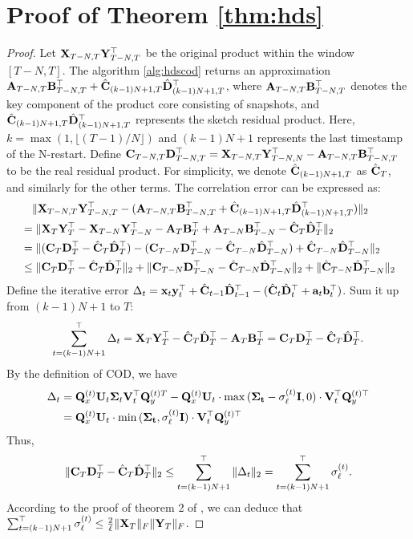 \section{Proof of Theorem \ref{thm:hds}}\label{apdx:hds}
\begin{proof}
    
Let ${\bf X}_{T-N,T}{\bf Y}_{T-N,T}^\top$ be the original product within the window $[T-N,T]$. The algorithm \ref{alg:hdscod} returns an approximation ${\bf A}_{T-N,T}{\bf B}_{T-N,T}^\top+\hat{{\bf C}}_{(k-1)N+1,T}\hat{{\bf D}}_{(k-1)N+1,T}^\top$, where ${\bf A}_{T-N,T}{\bf B}_{T-N,T}^\top$ denotes the key component of the product core consisting of snapshots, and $\hat{{\bf C}}_{(k-1)N+1,T}\hat{{\bf D}}_{(k-1)N+1,T}^\top$ represents the sketch residual product.  Here, $k=\operatorname*{max}(1,\lfloor(T-1)/N\rfloor)$ and $(k-1)N+1$ represents the last timestamp of the N-restart. Define ${\bf C}_{T-N,T}{\bf D}_{T-N,T}^\top = {\bf X}_{T-N,T}{\bf Y}_{T-N,N}^\top-{\bf A}_{T-N,T}{\bf B}_{T-N,T}^\top$ to be the real residual product. For simplicity, we denote $\hat{{\bf C}}_{(k-1)N+1,T}$ as $\hat{{\bf C}}_T$, and similarly for the other terms. The correlation error can be expressed as:
\begin{align}
    &\quad \|    {\bf X}_{T-N,T}{\bf Y}_{T-N,T}^\top-({\bf A}_{T-N,T}{\bf B}_{T-N,T}^\top+\hat{{\bf C}}_{(k-1)N+1,T}\hat{{\bf D}}_{(k-1)N+1,T}^\top)    \|_2 \nonumber\\
    &= \|     {\bf X}_T{\bf Y}_T^\top - {\bf X}_{T-N}{\bf Y}_{T-N}^\top - {\bf A}_T{\bf B}_T^\top +{\bf A}_{T-N}{\bf B}_{T-N}^\top  -  \hat{{\bf C}}_T\hat{{\bf D}}_T^\top     \|_2 \nonumber\\
    &= \|     ({\bf C}_T{\bf D}_T^\top-\hat{{\bf C}}_T\hat{{\bf D}}_T^\top) - ({\bf C}_{T-N}{\bf D}_{T-N}^\top - \hat{{\bf C}}_{T-N}\hat{{\bf D}}_{T-N}^\top) +   \hat{{\bf C}}_{T-N}\hat{{\bf D}}_{T-N}^\top   \|_2 \nonumber\\
    &\leq \| {\bf C}_T{\bf D}_T^\top-\hat{{\bf C}}_T\hat{{\bf D}}_T^\top \|_2 + \| {\bf C}_{T-N}{\bf D}_{T-N}^\top - \hat{{\bf C}}_{T-N}\hat{{\bf D}}_{T-N}^\top \|_2 + \| \hat{{\bf C}}_{T-N}\hat{{\bf D}}_{T-N}^\top \|_2
\end{align}
Define the iterative error $\Delta_t = {\bf{x}}_t{\bf{y}}_t^\top + \hat{{\bf C}}_{t-1}\hat{{\bf D}}_{t-1}^\top - (\hat{{\bf C}}_{t}\hat{{\bf D}}_{t}^\top + {\bf{a}}_t {\bf{b}}_t^\top)$. Sum it up from $(k-1)N+1$ to $T$: 
\[
    \sum_{t=(k-1)N+1}^\top{\Delta_t}  = {\bf X}_T{\bf Y}_T^\top - \hat{{\bf C}}_{T}\hat{{\bf D}}_{T}^\top - {\bf A}_T{\bf B}_T^\top = {\bf C}_T{\bf D}_T^\top - \hat{{\bf C}}_{T}\hat{{\bf D}}_{T}^\top.
\]
By the definition of COD, we have
\begin{align}
    \Delta_t &= {\bf Q}_x^{(t)}{\bf U}_t\mathbf{\Sigma}_t{\bf V}_t^\top{\bf Q}_y^{(t)T} - {\bf Q}_x^{(t)}{\bf U}_t \cdot \max{(\mathbf{\Sigma_t}-\sigma_{\ell}^{(t)} {\bf I},0)} \cdot {\bf V}_t^\top{\bf Q}_y^{(t)\top} \nonumber\\
    &= {\bf Q}_x^{(t)} {\bf U}_t \cdot \min{(\mathbf{\Sigma_t},\sigma_{\ell}^{(t)} {\bf I})} \cdot {\bf V}_t^\top{\bf Q}_y^{(t)\top} \nonumber
\end{align}
Thus, 
\[
\| {\bf C}_T{\bf D}_T^\top - \hat{{\bf C}}_{T}\hat{{\bf D}}_{T}^\top \|_2 \leq \sum_{t=(k-1)N+1}^\top \| \Delta_t \|_2  = \sum_{t=(k-1)N+1}^\top \sigma_\ell^{(t)}.
\]
According to the proof of theorem 2 of \cite{mroueh2017co}, we can deduce that $\sum_{t=(k-1)N+1}^\top \sigma_\ell^{(t)} \leq \frac{2}{\ell}\|{\bf X}_T\|_F\|{\bf Y}_T\|_F $.


\end{proof}
